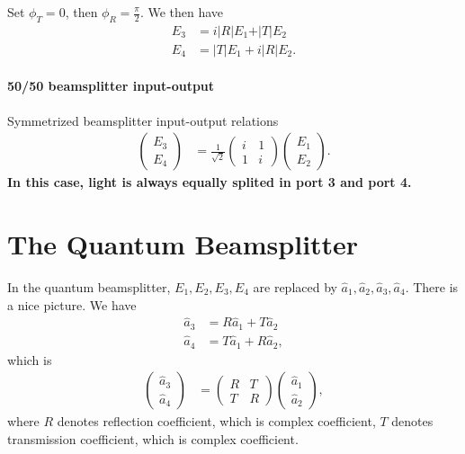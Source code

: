 \documentclass[../../note.tex]{subfiles}
\begin{document}
Set $\phi_T = 0$, then $\phi_R = \frac{\pi}{2}$. We then have
\begin{align}
    E_3
    &= i \vert R \vert E_1 + \vert T \vert E_2 \\
    E_4
    &= \vert T \vert E_1 + i \vert R \vert E_2.
\end{align}

\paragraph{50/50 beamsplitter input-output}
Symmetrized beamsplitter input-output relations
\begin{align}
    \label{eq: 50/50 classical beam splitter}
    \left(\begin{matrix}
        E_3 \\
        E_4
    \end{matrix}\right)
    &=  \frac{1}{\sqrt{2}}\left(\begin{matrix}
        i & 1 \\
        1 & i 
    \end{matrix}\right) 
    \left(\begin{matrix}
        E_1 \\
        E_2
    \end{matrix}\right).
\end{align}
\textbf{In this case, light is always equally splited in port 3 and port 4.}

\section{The Quantum Beamsplitter}
In the quantum beamsplitter, $E_1, E_2, E_3, E_4$ are replaced by $\hat{a}_1, \hat{a}_2, \hat{a}_3, \hat{a}_4$. There is a nice picture. We have
\begin{align}
    \hat{a}_3 
    &= R \hat{a}_1 + T \hat{a}_2 \\
    \hat{a}_4 
    &= T \hat{a}_1 + R \hat{a}_2,
\end{align}
which is 
\begin{align}
    \left(\begin{matrix}
        \hat{a}_3 \\
        \hat{a}_4
    \end{matrix}\right)
    &=  \left(\begin{matrix}
        R & T \\
        T & R 
    \end{matrix}\right) 
    \left(\begin{matrix}
        \hat{a}_1 \\
        \hat{a}_2
    \end{matrix}\right),
\end{align}
where $R$ denotes reflection coefficient, which is complex coefficient, $T$ denotes transmission coefficient, which is complex coefficient. 
\end{document}
